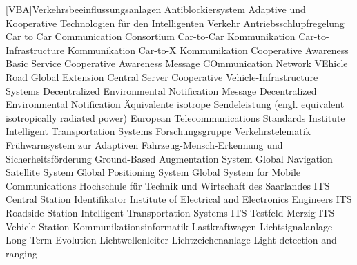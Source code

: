 
[VBA]{Verkehrsbeeinflussungsanlagen}
 {Antiblockiersystem}
 {Adaptive und Kooperative Technologien für den Intelligenten Verkehr}
 {Antriebsschlupfregelung}
 {Car to Car Communication Consortium}
 {Car-to-Car Kommunikation}
 {Car-to-Infra\-structure Kommunikation}
 {Car-to-X Kommunikation}
 {Cooperative Awareness Basic Service}
 {Cooperative Awareness Message}
 {COmmunication Network VEhicle Road Global Extension}
 {Central Server}
 {Cooperative Vehicle-Infrastructure Systems}
 {Decentralized Environmental Notification Message}
 {Decentralized Environmental Notification}
 {Äquivalente isotrope Sendeleistung (engl. equivalent isotropically radiated power)}
 {European Telecommunications Standards Institute Intelligent Transportation Systems}
 {Forschungsgruppe Verkehrstelematik}
 {Frühwarnsystem zur Adaptiven Fahrzeug-Mensch-Erkennung und Sicherheitsförderung}
 {Ground-Based Augmentation System}
 {Global Navigation Satellite System}
 {Global Positioning System}
 {Global System for Mobile Communications}
 {Hochschule für Technik und Wirtschaft des Saarlandes}
 {ITS Central Station}
 {Identifikator}
 {Institute of Electrical and Electronics Engineers}
 {\ac{ITS} Roadside Station}
 {Intelligent Transportation Systems}
 {ITS Testfeld Merzig}
 {ITS Vehicle Station}
 {Kommunikationsinformatik}
 {Lastkraftwagen}
 {Lichtsignalanlage}
 {Long Term Evolution}
 {Lichtwellenleiter}
 {Lichtzeichenanlage}
 {Light detection and ranging}
